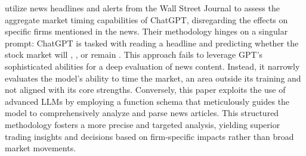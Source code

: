 \cite{chen2023chatgpt} utilize news headlines and alerts from the Wall Street Journal to assess the aggregate market timing capabilities of ChatGPT, disregarding the effects on specific firms mentioned in the news.  
Their methodology hinges on a singular prompt: ChatGPT is tasked with reading a headline and predicting whether the stock market will , , or remain .
This approach fails to leverage GPT's sophisticated abilities for a deep evaluation of news content. Instead, it narrowly evaluates the model's ability to time the market, an area outside its training and not aligned with its core strengths. Conversely, this paper exploits the use of advanced LLMs by employing a function schema that meticulously guides the model to comprehensively analyze and parse news articles. This structured methodology fosters a more precise and targeted analysis, yielding superior trading insights and decisions based on firm-specific impacts rather than broad market movements.

 
